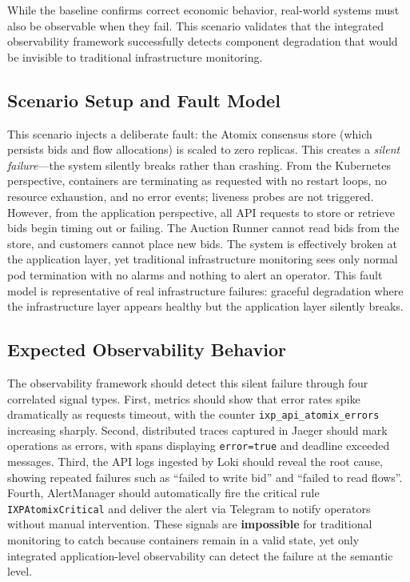 While the baseline confirms correct economic behavior, real-world systems must also be observable when they fail. This scenario validates that the integrated observability framework successfully detects component degradation that would be invisible to traditional infrastructure monitoring.

\subsection{Scenario Setup and Fault Model}

This scenario injects a deliberate fault: the Atomix consensus store (which persists bids and flow allocations) is scaled to zero replicas. This creates a \textit{silent failure}—the system silently breaks rather than crashing. From the Kubernetes perspective, containers are terminating as requested with no restart loops, no resource exhaustion, and no error events; liveness probes are not triggered. However, from the application perspective, all API requests to store or retrieve bids begin timing out or failing. The Auction Runner cannot read bids from the store, and customers cannot place new bids. The system is effectively broken at the application layer, yet traditional infrastructure monitoring sees only normal pod termination with no alarms and nothing to alert an operator. This fault model is representative of real infrastructure failures: graceful degradation where the infrastructure layer appears healthy but the application layer silently breaks.

\subsection{Expected Observability Behavior}

The observability framework should detect this silent failure through four correlated signal types. First, metrics should show that error rates spike dramatically as requests timeout, with the counter \texttt{ixp\_api\_atomix\_errors} increasing sharply. Second, distributed traces captured in Jaeger should mark operations as errors, with spans displaying \texttt{error=true} and deadline exceeded messages. Third, the API logs ingested by Loki should reveal the root cause, showing repeated failures such as ``failed to write bid'' and ``failed to read flows''. Fourth, AlertManager should automatically fire the critical rule \texttt{IXPAtomixCritical} and deliver the alert via Telegram to notify operators without manual intervention. These signals are \textbf{impossible} for traditional monitoring to catch because containers remain in a valid state, yet only integrated application-level observability can detect the failure at the semantic level.

